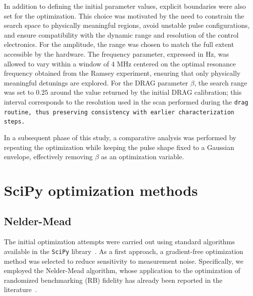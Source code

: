 In addition to defining the initial parameter values, explicit boundaries were also set for the optimization. 
This choice was motivated by the need to constrain the search space to physically meaningful regions, avoid unstable pulse configurations, and ensure compatibility with the dynamic range and resolution of the control electronics.
For the amplitude, the range was chosen to match the full extent accessible by the hardware. 
The frequency parameter, expressed in Hz, was allowed to vary within a window of 4 MHz centered on the optimal resonance frequency obtained from the Ramsey experiment, ensuring that only physically meaningful detunings are explored. 
For the DRAG parameter $\beta$, the search range was set to $0.25$ around the value returned by the initial DRAG calibration; this interval corresponds to the resolution used in the scan performed during the \tt{drag} routine, thus preserving consistency with earlier characterization steps.

In a subsequent phase of this study, a comparative analysis was performed by repeating the optimization while keeping the pulse shape fixed to a Gaussian envelope, effectively removing $\beta$ as an optimization variable. 

\section{SciPy optimization methods}\label{Sec:OptimizationMethods}

\subsection{Nelder-Mead}
The initial optimization attempts were carried out using standard algorithms available in the \texttt{SciPy} library~\cite{SciPy-NMeth}. 
As a first approach, a gradient-free optimization method was selected to reduce sensitivity to measurement noise. 
Specifically, we employed the Nelder-Mead algorithm, whose application to the optimization of randomized benchmarking (RB) fidelity has already been reported in the literature~\cite{kelly_optimal_2014}.

